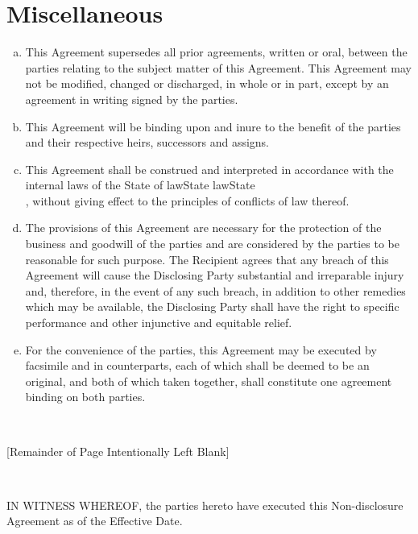 \documentclass[10pt]{article}
\makeatletter
\edef\history{ }
\newcommand{\VAR}[1]{{\color{blue} #1}\g@addto@macro\history{#1\\}}
\newcommand{\BLOCK}[1]{~\newline{ \color{red}#1 }}
\makeatother
\begin{document}
\section{Miscellaneous}
\begin{enumerate}[a)]
\item This Agreement supersedes all prior agreements, written or oral, between the parties relating to the subject matter of this Agreement.  This Agreement may not be modified, changed or discharged, in whole or in part, except by an agreement in writing signed by the parties.
\item This Agreement will be binding upon and inure to the benefit of the parties and their respective heirs, successors and assigns.
\item This Agreement shall be construed and interpreted in accordance with the internal laws of the State of \VAR{lawState}, without giving effect to the principles of conflicts of law thereof.
\item The provisions of this Agreement are necessary for the protection of the business and goodwill of the parties and are considered by the parties to be reasonable for such purpose.  The Recipient agrees that any breach of this Agreement will cause the Disclosing Party substantial and irreparable injury and, therefore, in the event of any such breach, in addition to other remedies which may be available, the Disclosing Party shall have the right to specific performance and other injunctive and equitable relief.
\item For the convenience of the parties, this Agreement may be executed by facsimile and in counterparts, each of which shall be deemed to be an original, and both of which taken together, shall constitute one agreement binding on both parties.
\end{enumerate}

\BLOCK{if toPdf}
\vspace{1cm}
\begin{center}
[Remainder of Page Intentionally Left Blank]
\end{center}
\newpage
\BLOCK{endif}

IN WITNESS WHEREOF, the parties hereto have executed this Non-disclosure Agreement as of the Effective Date.

\renewcommand{\arraystretch}{2}
\setlength\parindent{0pt}

\vspace{2cm}
\end{document}
